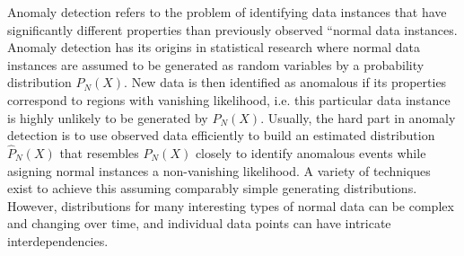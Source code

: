 Anomaly detection refers to the problem of identifying data instances that have significantly different properties than previously observed ``normal data instances. Anomaly detection has its origins in statistical research where normal data instances are assumed to be generated as random variables by a probability distribution $P_\textit{N}(X)$. New data is then identified as anomalous if its properties correspond to regions with vanishing likelihood, i.e. this particular data instance is highly unlikely to be generated by $P_\textit{N}(X)$. Usually, the hard part in anomaly detection is to use observed data efficiently to build an estimated distribution $\hat{P}_\textit{N}(X)$ that resembles $P_\textit{N}(X)$ closely to identify anomalous events while asigning normal instances a non-vanishing likelihood. A variety of techniques exist to achieve this assuming comparably simple generating distributions. However, distributions for many interesting types of normal data can be complex and changing over time, and individual data points can have intricate interdependencies. 

